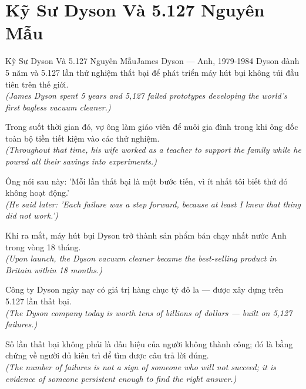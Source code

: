 \section{Kỹ Sư Dyson Và 5.127 Nguyên Mẫu}
\begin{truyen}{Kỹ Sư Dyson Và 5.127 Nguyên Mẫu}{James Dyson --- Anh, 1979-1984}
 Dyson dành 5 năm và 5.127 lần thử nghiệm thất bại để phát triển máy hút bụi không túi đầu tiên trên thế giới.\\[4pt]
\textit{(James Dyson spent 5 years and 5,127 failed prototypes developing the world's first bagless vacuum cleaner.)}

Trong suốt thời gian đó, vợ ông làm giáo viên để nuôi gia đình trong khi ông dốc toàn bộ tiền tiết kiệm vào các thử nghiệm.\\[4pt]
\textit{(Throughout that time, his wife worked as a teacher to support the family while he poured all their savings into experiments.)}

Ông nói sau này: 'Mỗi lần thất bại là một bước tiến, vì ít nhất tôi biết thứ đó không hoạt động.'\\[4pt]
\textit{(He said later: 'Each failure was a step forward, because at least I knew that thing did not work.')}

Khi ra mắt, máy hút bụi Dyson trở thành sản phẩm bán chạy nhất nước Anh trong vòng 18 tháng.\\[4pt]
\textit{(Upon launch, the Dyson vacuum cleaner became the best-selling product in Britain within 18 months.)}

Công ty Dyson ngày nay có giá trị hàng chục tỷ đô la --- được xây dựng trên 5.127 lần thất bại.\\[4pt]
\textit{(The Dyson company today is worth tens of billions of dollars --- built on 5,127 failures.)}

\end{truyen}
\begin{baihoc}
  Số lần thất bại không phải là dấu hiệu của người không thành công; đó là bằng chứng về người đủ kiên trì để tìm được câu trả lời đúng.\\[4pt]
  \textit{(The number of failures is not a sign of someone who will not succeed; it is evidence of someone persistent enough to find the right answer.)}
\end{baihoc}

